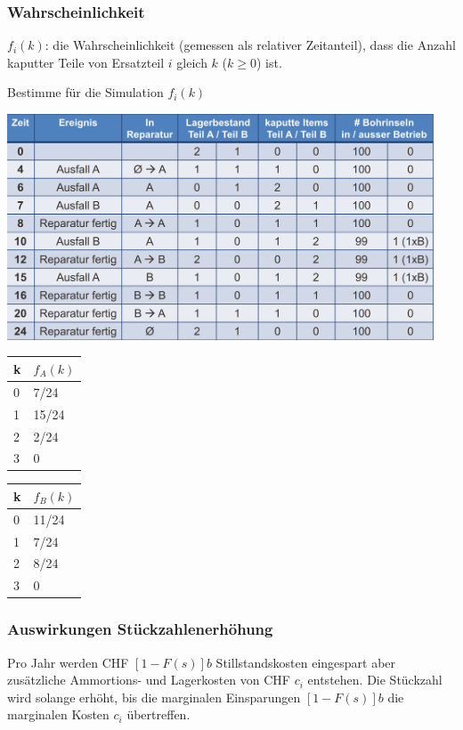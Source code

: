 \subsubsection{Wahrscheinlichkeit} $f_i(k)$: die Wahrscheinlichkeit (gemessen als relativer Zeitanteil), dass die Anzahl kaputter Teile von Ersatzteil $i$ gleich $k$ ($k \geq 0$) ist.
\begin{example}
	Bestimme für die Simulation $f_i(k)$ \\
	\begin{minipage}[h]{0.7\textwidth}
		\includegraphics[width=0.95\textwidth]{pictures/reparatur} 
	\end{minipage}
	\begin{minipage}[h]{0.15\textwidth}
		\begin{tabular}{|l|l|}
			\hline
			k & $f_A(k)$ \\ \hline
			0 & 7/24 \\ \hline
			1 & 15/24 \\ \hline
			2 & 2/24 \\ \hline
			3 & 0 \\ \hline
		\end{tabular}
		\begin{tabular}{|l|l|}
			\hline
			k & $f_B(k)$ \\ \hline
			0 & 11/24 \\ \hline
			1 & 7/24 \\ \hline
			2 & 8/24 \\ \hline
			3 & 0 \\ \hline
		\end{tabular}
	\end{minipage}
\end{example}

\subsubsection{Auswirkungen Stückzahlenerhöhung} Pro Jahr werden CHF $[1-F(s)]b$ Stillstandskosten eingespart aber zusätzliche Ammortions- und Lagerkosten von CHF $c_i$ entstehen. Die Stückzahl wird solange erhöht, bis die marginalen Einsparungen $[1-F(s)]b$ die marginalen Kosten $c_i$ übertreffen.

